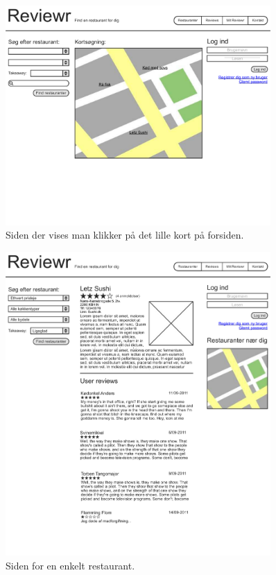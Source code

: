 \documentclass[a4paper, 12pt]{article}
\begin{document}
\begin{figure}[hp]
  \centering
  \includegraphics[width=0.9\textwidth]{mockup/page7.pdf}
  \caption{Siden der vises man klikker på det lille kort på forsiden.}
\end{figure}


\begin{figure}[hp]
  \centering
  \includegraphics[width=0.9\textwidth]{mockup/page3.pdf}
  \caption{Siden for en enkelt restaurant.}
\end{figure}
\end{document}
